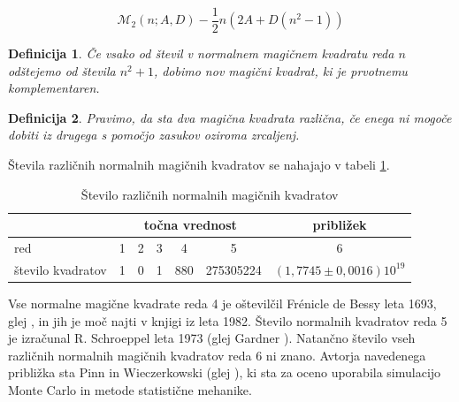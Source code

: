 \documentclass[a4paper,12pt]{article}
\newtheorem{definicija}{Definicija}
\newcommand{\m}{{\mathcal{M}}_2}
\begin{document}
\[\m(n;A,D) - \frac{1}{2}n(2A + D(n^2-1))\]

\begin{definicija}
      Če vsako od števil v normalnem magičnem kvadratu reda \(n\) odštejemo
      od števila \(n^2 + 1\), dobimo nov magični kvadrat, ki je prvotnemu
      \emph{komplementaren}.
\end{definicija}

\begin{definicija}
      Pravimo, da sta dva magična kvadrata \emph{različna}, če enega ni mogoče dobiti
      iz drugega s pomočjo zasukov oziroma zrcaljenj.
\end{definicija}

Števila različnih normalnih magičnih kvadratov se nahajajo v tabeli \ref{table:stevila}.

\begin{table}[!ht]
   \centering
   \caption{Število različnih normalnih magičnih kvadratov}
   \begin{tabular}{lcccccc}\toprule
   & \multicolumn{5}{c}{točna vrednost} & približek \\\midrule
      red & 1 & 2 & 3 & 4 & 5 & 6 \\
      število kvadratov & 1 &  0 &  1 & 880 & 275305224 & $(1{,}7745 \pm 0{,}0016)10^{19}$\\\bottomrule
   \end{tabular}
   \label{table:stevila}
\end{table}

Vse normalne magične kvadrate reda 4 je oštevilčil Frénicle de Bessy
leta 1693, glej \cite{bessy}, in jih je moč najti v knjigi \cite{berlekamp}
iz leta 1982. Število normalnih kvadratov reda 5 je izračunal
R. Schroeppel leta 1973 (glej Gardner \cite{gardner}).
Natančno število vseh različnih normalnih magičnih kvadratov reda 6 ni znano.
Avtorja navedenega približka sta Pinn in Wieczerkowski (glej \cite{pinn}), ki
sta za oceno uporabila simulacijo Monte Carlo in metode statistične mehanike.


\newpage




\end{document}
